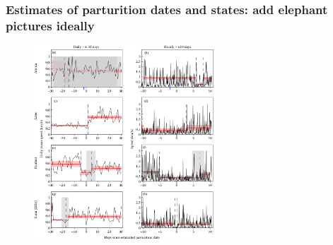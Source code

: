 \documentclass[main.tex]{subfiles}
\begin{document}
\begin{frame}
\frametitle{Estimates of parturition dates and states: add elephant pictures ideally}

\begin{figure}
    \centering
    \includegraphics[width=0.6\textwidth]{figures/parturition_dates.jpg}
\end{figure}
    
\end{frame}
\end{document}
